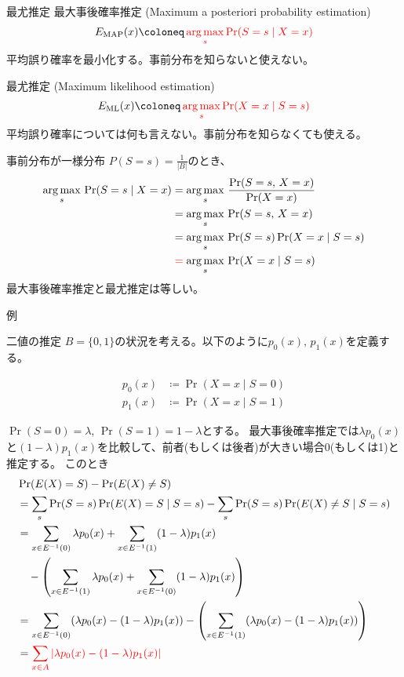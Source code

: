 \documentclass[lualatex,handout]{beamer}
\newcommand{\mycolor}[2]{%
  \begingroup
  \colorlet{currentcolor}{.}%
  \color{#1}#2%
  \color{currentcolor}%
  \endgroup
}
\newcommand{\emm}[1]{\mycolor{red}{#1}}
\DeclareMathOperator*{\argmax}{arg\,max}
\theoremstyle{definition}
\begin{document}
\begin{frame}{最尤推定}
\footnotesize
最大事後確率推定 (Maximum a posteriori probability estimation)
\begin{align*}
E_{\mathrm{MAP}}(x)\coloneq\emm{\argmax_{s} \Pr(S=s\mid X=x)}
\end{align*}
平均誤り確率を最小化する。事前分布を知らないと使えない。

\vspace{1.5em}
最尤推定 (Maximum likelihood estimation)
\begin{align*}
E_{\mathrm{ML}}(x)\coloneq\emm{\argmax_{s} \Pr(X=x\mid S=s)}
\end{align*}
平均誤り確率については何も言えない。事前分布を知らなくても使える。

\vspace{1.5em}
\emm{事前分布が一様分布}$P(S=s)=\frac1{|B|}$のとき、
\begin{align*}
\argmax_{s}\, \Pr(S=s\mid X=x)
&= \argmax_{s}\, \frac{\Pr(S=s,\, X=x)}{\Pr(X=x)}\\
&= \argmax_{s}\, \Pr(S=s,\, X=x)\\
&= \argmax_{s}\, \Pr(S=s)\Pr(X=x\mid S = s)\\
&\emm{=} \argmax_{s}\, \Pr(X=x\mid S = s)
\end{align*}
最大事後確率推定と最尤推定は等しい。
\end{frame}

\begin{frame}{例}

\end{frame}
\fi

\begin{frame}{二値の推定}
\footnotesize
$B = \{0,1\}$の状況を考える。以下のように$p_0(x),\,p_1(x)$を定義する。

\begin{align*}
p_0(x) &\coloneq \Pr(X=x\mid S=0)\\
p_1(x) &\coloneq \Pr(X=x\mid S=1)
\end{align*}

\vspace{.5em}
$\Pr(S=0)=\lambda$, $\Pr(S=1)=1-\lambda$とする。
最大事後確率推定では$\lambda p_0(x)$と$(1-\lambda)p_1(x)$を比較して、前者(もしくは後者)が大きい場合0(もしくは1)と推定する。
このとき
\begin{align*}
&\Pr(E(X) = S) - \Pr(E(X)\ne S)\\
&= \sum_s \Pr(S=s) \Pr(E(X) = S\mid S = s)
- \sum_s \Pr(S=s) \Pr(E(X) \ne S\mid S = s)\\
&=\sum_{x\in E^{-1}(0)} \lambda p_0(x) + \sum_{x\in E^{-1}(1)} (1-\lambda)p_1(x)\\
&\quad -\left(\sum_{x\in E^{-1}(1)} \lambda p_0(x) + \sum_{x\in E^{-1}(0)} (1-\lambda)p_1(x)\right)\\
&=\sum_{x\in E^{-1}(0)} (\lambda p_0(x) - (1-\lambda)p_1(x))
-\left(\sum_{x\in E^{-1}(1)} (\lambda p_0(x) - (1-\lambda)p_1(x))\right)\\
&=\emm{\sum_{x\in A} \left|\lambda p_0(x) - (1-\lambda)p_1(x)\right|}
\end{align*}
\end{frame}
\end{document}
